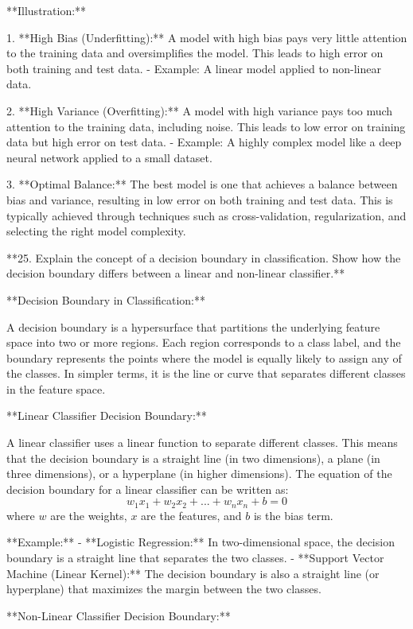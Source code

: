 **Illustration:**

1. **High Bias (Underfitting):** A model with high bias pays very little attention to the training data and oversimplifies the model. This leads to high error on both training and test data.
    - Example: A linear model applied to non-linear data.

2. **High Variance (Overfitting):** A model with high variance pays too much attention to the training data, including noise. This leads to low error on training data but high error on test data.
    - Example: A highly complex model like a deep neural network applied to a small dataset.

3. **Optimal Balance:** The best model is one that achieves a balance between bias and variance, resulting in low error on both training and test data. This is typically achieved through techniques such as cross-validation, regularization, and selecting the right model complexity.

**25. Explain the concept of a decision boundary in classification. Show how the decision boundary differs between a linear and non-linear classifier.**

**Decision Boundary in Classification:**

A decision boundary is a hypersurface that partitions the underlying feature space into two or more regions. Each region corresponds to a class label, and the boundary represents the points where the model is equally likely to assign any of the classes. In simpler terms, it is the line or curve that separates different classes in the feature space.

**Linear Classifier Decision Boundary:**

A linear classifier uses a linear function to separate different classes. This means that the decision boundary is a straight line (in two dimensions), a plane (in three dimensions), or a hyperplane (in higher dimensions). The equation of the decision boundary for a linear classifier can be written as:
\[ w_1x_1 + w_2x_2 + ... + w_nx_n + b = 0 \]
where \( w \) are the weights, \( x \) are the features, and \( b \) is the bias term.

**Example:**
- **Logistic Regression:** In two-dimensional space, the decision boundary is a straight line that separates the two classes.
- **Support Vector Machine (Linear Kernel):** The decision boundary is also a straight line (or hyperplane) that maximizes the margin between the two classes.

**Non-Linear Classifier Decision Boundary:**

